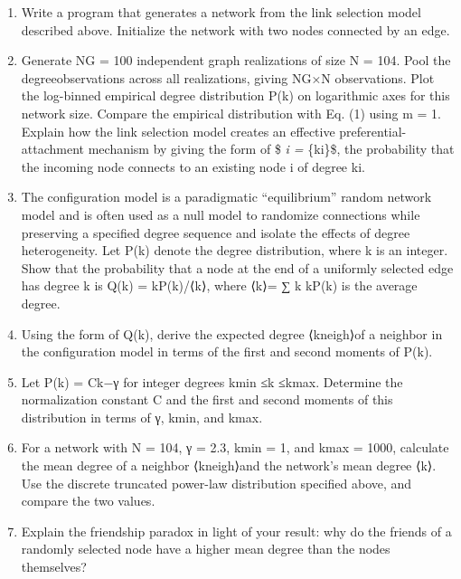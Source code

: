 \documentclass[11pt]{article}
\begin{document}
\begin{enumerate}
\def\labelenumi{(\alph{enumi})}
\item
  Write a program that generates a network from the link selection model
  described above. Initialize the network with two nodes connected by an
  edge.
\item
  Generate NG = 100 independent graph realizations of size N = 104. Pool
  the degreeobservations across all realizations, giving NG×N
  observations. Plot the log-binned empirical degree distribution P(k)
  on logarithmic axes for this network size. Compare the empirical
  distribution with Eq. (1) using m = 1. Explain how the link selection
  model creates an effective preferential-attachment mechanism by giving
  the form of \$ \Pi\emph{i = \Pi}\{ki\}\$, the probability that the
  incoming node connects to an existing node i of degree ki.
\item
  The configuration model is a paradigmatic ``equilibrium'' random
  network model and is often used as a null model to randomize
  connections while preserving a specified degree sequence and isolate
  the effects of degree heterogeneity. Let P(k) denote the degree
  distribution, where k is an integer. Show that the probability that a
  node at the end of a uniformly selected edge has degree k is Q(k) =
  kP(k)/⟨k⟩, where ⟨k⟩= ∑ k kP(k) is the average degree.
\item
  Using the form of Q(k), derive the expected degree ⟨kneigh⟩of a
  neighbor in the configuration model in terms of the first and second
  moments of P(k).
\item
  Let P(k) = Ck−γ for integer degrees kmin ≤k ≤kmax. Determine the
  normalization constant C and the first and second moments of this
  distribution in terms of γ, kmin, and kmax.
\item
  For a network with N = 104, γ = 2.3, kmin = 1, and kmax = 1000,
  calculate the mean degree of a neighbor ⟨kneigh⟩and the network's mean
  degree ⟨k⟩. Use the discrete truncated power-law distribution
  specified above, and compare the two values.
\item
  Explain the friendship paradox in light of your result: why do the
  friends of a randomly selected node have a higher mean degree than the
  nodes themselves?
\end{enumerate}
\end{document}
